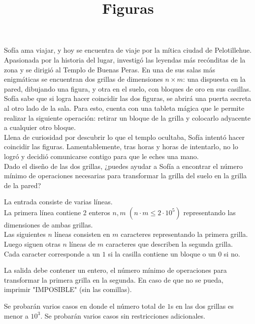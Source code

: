 \documentclass{oci}
\title{Figuras}
\begin{document}
\begin{problemDescription}
Sofía ama viajar, y hoy se encuentra de viaje por la mítica ciudad de Pelotillehue.\\

Apasionada por la historia del lugar, investigó las leyendas más recónditas de la zona y se dirigió al Templo de Buenas Peras. En una de sus salas más enigmáticas se encuentran dos grillas de dimensiones $n \times m$: una dispuesta en la pared, dibujando una figura, y otra en el suelo, con bloques de oro en sus casillas. \\

Sofía sabe que si logra hacer coincidir las dos figuras, se abrirá una puerta secreta al otro lado de la sala. Para esto, cuenta con una tableta mágica que le permite realizar la siguiente operación: retirar un bloque de la grilla y colocarlo adyacente a cualquier otro bloque. \\

Llena de curiosidad por descubrir lo que el templo ocultaba, Sofía intentó hacer coincidir las figuras. Lamentablemente, tras horas y horas de intentarlo, no lo logró y decidió comunicarse contigo para que le eches una mano. \\

Dado el diseño de las dos grillas, ¿puedes ayudar a Sofía a encontrar el número mínimo de operaciones necesarias para transformar la grilla del suelo en la grilla de la pared?

\end{problemDescription}

\begin{inputDescription}
La entrada consiste de varias líneas.\\
La primera línea contiene 2 enteros $n, m$ $(n \cdot m \leq 2 \cdot 10^5)$ representando las dimensiones de ambas grillas.\\

Las siguientes $n$ líneas consisten en $m$ caracteres representando la primera grilla.\\

Luego siguen otras $n$ líneas de $m$ caracteres que describen la segunda grilla.\\

Cada caracter corresponde a un $1$ si la casilla contiene un bloque o un $0$ si no.
\end{inputDescription}

\begin{outputDescription}
La salida debe contener un entero, el número mínimo de operaciones para transformar la primera grilla en la segunda. En caso de que no se pueda, imprimir "IMPOSIBLE" (sin las comillas).
\end{outputDescription}

\begin{scoreDescription}
  Se probarán varios casos en donde el número total de $1$s en las dos grillas es menor a $10^3$.
  Se probarán varios casos sin restricciones adicionales.
\end{scoreDescription}

\begin{sampleDescription}
\end{sampleDescription}
\end{document}
